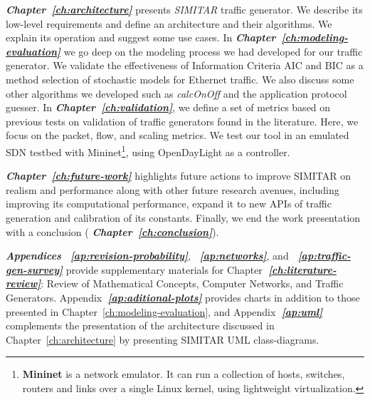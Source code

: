 \textit{\textbf{Chapter~\ref{ch:architecture}}} presents \textit{SIMITAR} traffic generator. We describe its low-level requirements and define an architecture and their algorithms.  We explain its operation and suggest some use cases. In \textit{\textbf{Chapter~\ref{ch:modeling-evaluation}}} we go deep on the modeling process we had developed for our traffic generator. We validate the effectiveness of Information Criteria \acrshort{AIC} and \acrshort{BIC} as a method selection of stochastic models for  Ethernet traffic.  We also discuss some other algorithms we developed such as \textit{calcOnOff} and the application protocol guesser. In \textit{\textbf{Chapter~\ref{ch:validation}}}, we define a set of metrics based on previous tests on validation of traffic generators found in the literature. Here, we focus on the packet, flow, and scaling metrics. We test our tool in an emulated SDN testbed with Mininet\cite{web-mininet}\footnote{\textbf{Mininet} is a network emulator. It can run a collection of  hosts, switches, routers and links over a single Linux kernel, using lightweight virtualization\cite{web-mininet-repo}.}, using OpenDayLight\cite{web-opendaylight} as a controller. 

\textit{\textbf{Chapter~\ref{ch:future-work}}}  highlights future actions to improve SIMITAR on realism and performance along with other future research avenues, including improving its computational performance, expand it to new APIs of traffic generation and calibration of its constants. Finally, we end the work presentation with a conclusion ( \textit{\textbf{Chapter~\ref{ch:conclusion}}}).

\textit{\textbf{Appendices}} \textit{\textbf{~\ref{ap:revision-probability}}}, \textit{\textbf{~\ref{ap:networks}}}, and \textit{\textbf{~\ref{ap:traffic-gen-survey}}} provide supplementary materials for Chapter\textit{\textbf{~\ref{ch:literature-review}}}: Review of Mathematical Concepts, Computer Networks, and Traffic Generators. Appendix\textit{\textbf{~\ref{ap:aditional-plots}}} provides charts in addition to those presented in Chapter~\ref{ch:modeling-evaluation}, and Appendix\textit{\textbf{~\ref{ap:uml}}} complements the presentation of the architecture discussed in Chapter~\ref{ch:architecture} by presenting SIMITAR  UML class-diagrams.